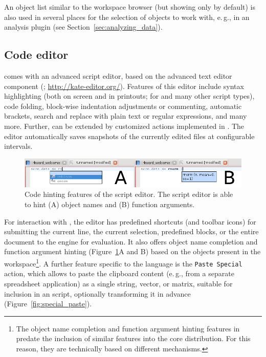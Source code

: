 An object list similar to the workspace browser (but showing only 
 by default) is also used in several places for the
selection of objects to work with, e.\,g., in an analysis plugin (see Section~\ref{sec:analyzing_data}).


\subsection{Code editor}
\label{sec:code_editor}

 comes with an advanced
 script editor, based on the
 advanced text editor component (; \url{http://kate-editor.org/}). Features of this
editor include syntax highlighting (both on screen and in printouts; for
 and many other script types), code
folding, block-wise indentation adjustments or commenting, automatic
brackets, search and replace with plain text or regular expressions,
and many more. Further,  can be extended by 
customized actions implemented in  \citep{KateScriptedActions}.
The editor automatically saves snapshots of the
currently edited files at configurable intervals. 

\begin{figure}[t!]
 \centering
 \includegraphics[width=15.5cm]{./figures/code_hinting.png}
 \caption{Code hinting features of the script editor. The script editor is able to hint (A)  object names
and (B) function arguments.}
 \label{fig:code_hinting}
\end{figure}

\medskip
For interaction with , the editor has
predefined shortcuts (and toolbar icons) for submitting the current line, the current 
selection, predefined blocks, or the entire document to the
 engine for evaluation. It also 
offers object name completion and function argument hinting 
(Figure~\ref{fig:code_hinting}A and B) based on the objects present in
the  workspace\footnote{The object name
completion and function argument hinting features in  predate the
inclusion of similar features into the core
 distribution. For this reason, they are
technically based on different mechanisms.}. A further feature specific
to the  language is the
\texttt{Paste Special} action, which allows to
paste the clipboard content (e.\,g., from a separate spreadsheet
application) as a single string, vector, or matrix, suitable
for inclusion in an  script, optionally
transforming it in advance (Figure~\ref{fig:special_paste}).

